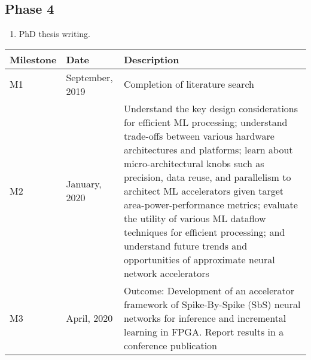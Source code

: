 \subsection{Phase 4}
\begin{enumerate}
\item PhD thesis writing.
\end{enumerate}
	
	\begin{longtable}{|l|l|m{9cm}|}
		\hline
		\rowcolor[HTML]{C0C0C0} 
		\textbf{Milestone} & \textbf{Date}   & \textbf{Description}                                                                                                                                                                                                                                                                                                                                                                                                                                                                \\ \hline
		M1                 & September, 2019 & Completion of literature search                                                                                                                                                                                                                                                                                                                                                                                                                                                     \\ \hline
		M2                 & January, 2020   & Understand the key design considerations for efficient ML processing; understand trade-offs between various hardware architectures and platforms; learn about micro-architectural knobs such as precision, data reuse, and parallelism to architect ML accelerators given target area-power-performance metrics; evaluate the utility of various ML dataflow techniques for efficient processing; and understand future trends and opportunities of approximate neural network accelerators \\ \hline
		M3                 & April, 2020     & Outcome: Development of an accelerator framework of Spike-By-Spike (SbS) neural networks for inference and incremental learning in FPGA. Report results in a conference publication \cite{nevarez2020accelerator}                                                                                                                                                                                                                                                                                                                                                                     \\ \hline

\end{longtable}
